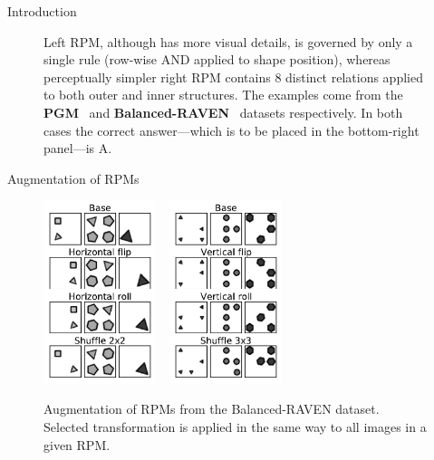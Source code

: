 \documentclass[final]{beamer}
\newlength{\colwidth}
\begin{document}
\begin{frame}[t]
\begin{columns}[t]
\begin{column}{\colwidth}
\begin{block}{Introduction}
\begin{figure}
{                        Left RPM, although has more visual details, is governed by only a single rule (row-wise AND applied to shape position), whereas perceptually simpler right RPM contains 8 distinct relations applied to both outer and inner structures.
                        The examples come from the \textbf{PGM}~\cite{santoro2018measuring} and \textbf{Balanced-RAVEN}~\cite{zhang2019raven} datasets respectively.
                        In both cases the correct answer---which is to be placed in the bottom-right panel---is A.
                        }
                        \label{fig:rpm}
                    \end{figure}
                \end{block}

                \begin{block}{Augmentation of RPMs}
                    \begin{figure}[t]
                        \centering
                        \includegraphics[width=0.29\textwidth]{augmentation_2x2}
                        ~
                        \includegraphics[width=0.29\textwidth]{augmentation_3x3}
                        \caption{
                        Augmentation of RPMs from the Balanced-RAVEN dataset.
                        Selected transformation is applied in the same way to all images in a given RPM.
}
\end{figure}
\end{block}
\end{column}
\end{columns}
\end{frame}
\end{document}
